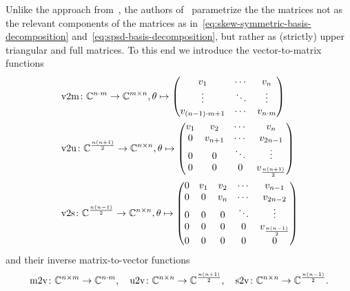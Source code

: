 
Unlike the approach from~\cite{Najnudel2021}, the authors of~\cite{Schwerdtner2021, SV2021, Schwerdtner2022, Schwerdtner2023} parametrize the the matrices not as the relevant components of the matrices as in~\eqref{eq:skew-symmetric-basis-decomposition} and~\eqref{eq:spsd-basis-decomposition}, but rather as (strictly) upper triangular and full matrices.
To this end we introduce the vector-to-matrix functions
\begin{align}
    &\mathop{}\!\mathrm{v}2\mathrm{m} \colon \mathbb{C}^{n \cdot m} \to \mathbb{C}^{m \times n}, \theta \mapsto \begin{pmatrix}
        v_1 & \cdots & v_n \\
        \vdots & \ddots & \vdots \\
        v_{(n - 1) \cdot m + 1} & \cdots & v_{n \cdot m}
    \end{pmatrix} \label{eq:v2m}\\
    &\mathop{}\!\mathrm{v}2\mathrm{u} \colon \mathbb{C}^{\frac{n (n + 1)}{2}} \to \mathbb{C}^{n \times n}, \theta \mapsto \begin{pmatrix}
        v_1 & v_2 & \cdots & v_n \\
        0 & v_{n + 1} & \cdots & v_{2n - 1} \\
        0 & 0 & \ddots & \vdots \\
        0 & 0 & 0 & v_{\frac{n (n + 1)}{2}}
    \end{pmatrix} \label{eq:v2u}\\
    &\mathop{}\!\mathrm{v}2\mathrm{s} \colon \mathbb{C}^{\frac{n (n - 1)}{2}} \to \mathbb{C}^{n \times n}, \theta \mapsto \begin{pmatrix}
        0 & v_1 & v_2 & \cdots & v_{n - 1} \\
        0 & 0 & v_n & \cdots & v_{2n - 2} \\
        0 & 0 & 0 & \ddots & \vdots \\
        0 & 0 & 0 & 0 & v_{\frac{n (n - 1)}{2}} \\
        0 & 0 & 0 & 0 & 0
    \end{pmatrix} \label{eq:v2s}
\end{align}
and their inverse matrix-to-vector functions
\begin{equation}\label{eq:m2v-functions}
    \mathop{}\!\mathrm{m}2\mathrm{v} \colon \mathbb{C}^{n \times m} \to \mathbb{C}^{n \cdot m},\quad \mathop{}\!\mathrm{u}2\mathrm{v} \colon \mathbb{C}^{n \times n} \to \mathbb{C}^{\frac{n (n + 1)}{2}},\quad \mathop{}\!\mathrm{s}2\mathrm{v} \colon \mathbb{C}^{n \times n} \to \mathbb{C}^{\frac{n (n - 1)}{2}}.
\end{equation}
